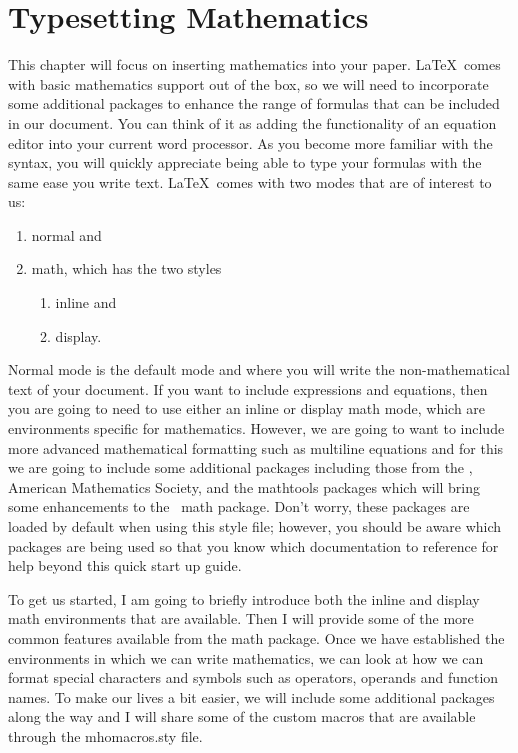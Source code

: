 \chapter{Typesetting Mathematics}

This chapter will focus on inserting mathematics into your paper. \LaTeX\ comes 
with basic mathematics support out of the box, so we will need to 
incorporate some additional packages to enhance the range of formulas that can 
be included in our document.  You can think of it as adding the functionality 
of an equation editor into your current word processor. As you become more 
familiar with the syntax, you will quickly appreciate being able to type
your formulas with the same ease you write text.
\LaTeX\ comes with two modes that are of interest to us:
\begin{enumerate}
  \item normal and
  \item math, which has the two styles
  \begin{enumerate}
    \item inline and
    \item display.
  \end{enumerate}
\end{enumerate}
Normal mode is the default mode and where you will write the non-mathematical text
of your document.  If you want to include expressions and equations,
then you are going to need to use either an inline or display math mode, 
which are environments specific for mathematics.  However, we are going to
want to include more advanced mathematical formatting such as multiline 
equations and for this we are going to include some additional packages
including those from the \AmS, American Mathematics Society, and the mathtools\cite{CTANmathtools}
packages which will bring some enhancements to the \AmS\ math package\cite{CTANamsmath}.  Don't worry,
these packages are loaded by default when using this style file; however, 
you should be aware which packages are being used so that you know which 
documentation to reference for help beyond this quick start up guide.

To get us started, I am going to briefly introduce both the inline and 
display math environments that are available.  Then I will provide some of the 
more common features available from the \AmS math package.  Once we have 
established the environments in which we can write mathematics, we can look
at how we can format special characters  and symbols such as operators, 
operands and function names.  To make our lives a bit easier, we will include
some additional packages along the way and I will share some of the custom
macros that are available through the mhomacros.sty file.

